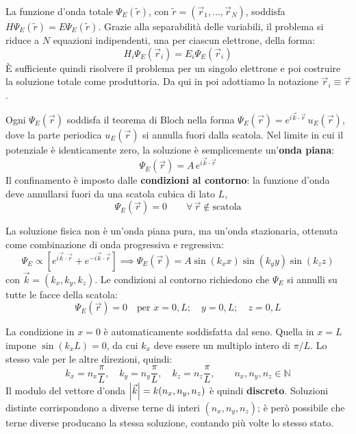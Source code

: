 La funzione d'onda totale \(\Psi_E(\tilde{r})\), con \(\tilde{r} = (\vec{r}_1, \ldots, \vec{r}_N)\), soddisfa \(H \Psi_E(\tilde{r}) = E \Psi_E(\tilde{r})\). Grazie alla separabilità delle variabili, il problema si riduce a \(N\) equazioni indipendenti, una per ciascun elettrone, della forma:
\begin{equation}
    H_i \Psi_E(\vec{r}_i) = E_i \Psi_E(\vec{r}_i)
\end{equation}
È sufficiente quindi risolvere il problema per un singolo elettrone e poi costruire la soluzione totale come produttoria. Da qui in poi adottiamo la notazione \(\vec{r}_i \equiv \vec{r}\).

Ogni \(\Psi_E(\vec{r})\) soddisfa il teorema di Bloch nella forma \(\Psi_E(\vec{r}) = e^{i\vec{k}\cdot\vec{r}}\, u_E(\vec{r})\), dove la parte periodica \(u_E(\vec{r})\) si annulla fuori dalla scatola. Nel limite in cui il potenziale è identicamente zero, la soluzione è semplicemente un'\textbf{onda piana}:
\begin{equation}
    \Psi_E(\vec{r}) = A\, e^{i\vec{k}\cdot\vec{r}}
\end{equation}
Il confinamento è imposto dalle \textbf{condizioni al contorno}: la funzione d'onda deve annullarsi fuori da una scatola cubica di lato \(L\),
\begin{equation}
    \Psi_E(\vec{r}) = 0 \qquad \forall\, \vec{r} \notin \text{scatola}
\end{equation}

La soluzione fisica non è un'onda piana pura, ma un'onda stazionaria, ottenuta come combinazione di onda progressiva e regressiva:
\begin{equation}
    \Psi_E \propto \left[ e^{i\vec{k}\cdot\vec{r}} + e^{-i\vec{k}\cdot\vec{r}} \right]
    \implies
    \Psi_E(\vec{r}) = A \sin(k_x x)\sin(k_y y)\sin(k_z z)
\end{equation}
con \(\vec{k} = (k_x, k_y, k_z)\). Le condizioni al contorno richiedono che \(\Psi_E\) si annulli su tutte le facce della scatola:
\begin{equation}
    \Psi_E(\vec{r}) = 0 \quad \text{per } x = 0, L; \quad y = 0, L; \quad z = 0, L
\end{equation}

La condizione in \(x = 0\) è automaticamente soddisfatta dal seno. Quella in \(x = L\) impone \(\sin(k_x L) = 0\), da cui \(k_x\) deve essere un multiplo intero di \(\pi/L\). Lo stesso vale per le altre direzioni, quindi:
\begin{equation}
    k_x = n_x \frac{\pi}{L}, \quad k_y = n_y \frac{\pi}{L}, \quad k_z = n_z \frac{\pi}{L}, \qquad n_x, n_y, n_z \in \mathbb{N}
\end{equation}
Il modulo del vettore d'onda \(\abs{\vec{k}} = k(n_x, n_y, n_z)\) è quindi \textbf{discreto}. Soluzioni distinte corrispondono a diverse terne di interi \((n_x, n_y, n_z)\); è però possibile che terne diverse producano la stessa soluzione, contando più volte lo stesso stato.

